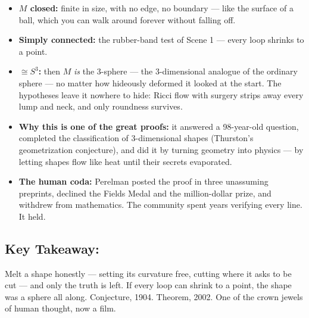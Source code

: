 \documentclass[11pt]{article}
\begin{document}
\begin{itemize}
  \item \textbf{\( M \) closed:} finite in size, with no edge, no boundary --- like
  the surface of a ball, which you can walk around forever without falling off.
  \item \textbf{Simply connected:} the rubber-band test of Scene 1 --- every loop
  shrinks to a point.
  \item \textbf{\( \cong S^3 \):} then $M$ \emph{is} the 3-sphere --- the
  3-dimensional analogue of the ordinary sphere --- no matter how hideously deformed
  it looked at the start. The hypotheses leave it nowhere to hide: Ricci flow with
  surgery strips away every lump and neck, and only roundness survives.
  \item \textbf{Why this is one of the great proofs:} it answered a 98-year-old
  question, completed the classification of 3-dimensional shapes (Thurston's
  geometrization conjecture), and did it by turning geometry into physics --- by
  letting shapes flow like heat until their secrets evaporated.
  \item \textbf{The human coda:} Perelman posted the proof in three unassuming
  preprints, declined the Fields Medal and the million-dollar prize, and withdrew
  from mathematics. The community spent years verifying every line. It held.
\end{itemize}

\subsection*{Key Takeaway:}

Melt a shape honestly --- setting its curvature free, cutting where it asks to be cut
--- and only the truth is left. If every loop can shrink to a point, the shape was a
sphere all along. Conjecture, 1904. Theorem, 2002. One of the crown jewels of human
thought, now a film.
\end{document}

